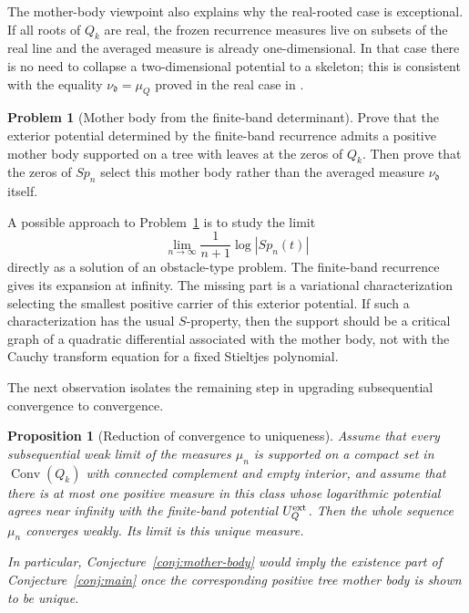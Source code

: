\documentclass[10pt,twoside,a4paper,reqno]{amsart}
\theoremstyle{plain}
\newtheorem{pro}            {Proposition}
\theoremstyle{definition}
\newtheorem{pr}              {Problem}
\theoremstyle{remark}
\newenvironment{proposition}{\begin{pro}}{\end{pro}}
\newenvironment{problem}{\begin{pr}}{\end{pr}}
\newcommand {\dq}{\mathfrak d}
\DeclareMathOperator{\Conv}{Conv}
\begin{document}
The mother-body viewpoint also explains why the real-rooted case is exceptional.  If all roots of $Q_k$ are real, the frozen recurrence measures live on subsets of the real line and the averaged measure is already one-dimensional.  In that case there is no need to collapse a two-dimensional potential to a skeleton; this is consistent with the equality $\nu_\dq=\mu_Q$ proved in the real case in \cite{BoSh}.

\begin{problem}[Mother body from the finite-band determinant]
\label{prob:finite-band-mother}
Prove that the exterior potential determined by the finite-band recurrence admits a positive mother body supported on a tree with leaves at the zeros of $Q_k$.  Then prove that the zeros of $Sp_n$ select this mother body rather than the averaged measure $\nu_\dq$ itself.
\end{problem}

A possible approach to Problem~\ref{prob:finite-band-mother} is to study the limit
\[
        \lim_{n\to\infty}\frac{1}{n+1}\log |Sp_n(t)|
\]
directly as a solution of an obstacle-type problem.  The finite-band recurrence gives its expansion at infinity.  The missing part is a variational characterization selecting the smallest positive carrier of this exterior potential.  If such a characterization has the usual $S$-property, then the support should be a critical graph of a quadratic differential associated with the mother body, not with the Cauchy transform equation for a fixed Stieltjes polynomial.

The next observation isolates the remaining step in upgrading subsequential convergence to convergence.

\begin{proposition}[Reduction of convergence to uniqueness]
\label{prop:uniqueness-reduction}
Assume that every subsequential weak limit of the measures $\mu_n$ is supported on a compact set in $\Conv(Q_k)$ with connected complement and empty interior, and assume that there is at most one positive measure in this class whose logarithmic potential agrees near infinity with the finite-band potential $U_Q^{\rm ext}$.  Then the whole sequence $\mu_n$ converges weakly.  Its limit is this unique measure.

In particular, Conjecture~\ref{conj:mother-body} would imply the existence part of Conjecture~\ref{conj:main} once the corresponding positive tree mother body is shown to be unique.
\end{proposition}
\end{document}
